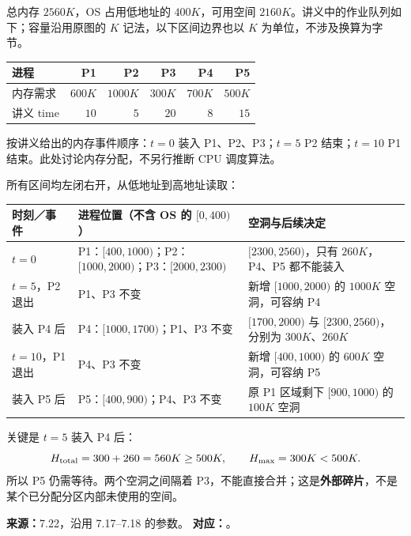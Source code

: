 总内存 $2560K$，OS 占用低地址的 $400K$，可用空间 $2160K$。讲义中的作业队列如下；容量沿用原图的 $K$ 记法，以下区间边界也以 $K$ 为单位，不涉及换算为字节。
\begin{center}
\begin{tabular}{@{}lrrrrr@{}}
\toprule
进程 & P1 & P2 & P3 & P4 & P5 \\
\midrule
内存需求 & $600K$ & $1000K$ & $300K$ & $700K$ & $500K$ \\
讲义 time & $10$ & $5$ & $20$ & $8$ & $15$ \\
\bottomrule
\end{tabular}
\end{center}
按讲义给出的内存事件顺序：$t=0$ 装入 P1、P2、P3；$t=5$ P2 结束；$t=10$ P1 结束。此处讨论内存分配，不另行推断 CPU 调度算法。

\begin{checkedsolution}
\nopagebreak[4]
所有区间均左闭右开，从低地址到高地址读取：
\begin{center}
\begin{tabularx}{\textwidth}{@{}>{\raggedright\arraybackslash}p{2.2cm}>{\raggedright\arraybackslash}X>{\raggedright\arraybackslash}X@{}}
\toprule
时刻／事件 & 进程位置（不含 OS 的 $[0,400)$） & 空洞与后续决定 \\
\midrule
$t=0$ & P1：$[400,1000)$；P2：$[1000,2000)$；P3：$[2000,2300)$ & $[2300,2560)$，只有 $260K$，P4、P5 都不能装入 \\
$t=5$，P2 退出 & P1、P3 不变 & 新增 $[1000,2000)$ 的 $1000K$ 空洞，可容纳 P4 \\
装入 P4 后 & P4：$[1000,1700)$；P1、P3 不变 & $[1700,2000)$ 与 $[2300,2560)$，分别为 $300K$、$260K$ \\
$t=10$，P1 退出 & P4、P3 不变 & 新增 $[400,1000)$ 的 $600K$ 空洞，可容纳 P5 \\
装入 P5 后 & P5：$[400,900)$；P4、P3 不变 & 原 P1 区域剩下 $[900,1000)$ 的 $100K$ 空洞 \\
\bottomrule
\end{tabularx}
\end{center}

关键是 $t=5$ 装入 P4 后：
\[
 H_{\rm total}=300+260=560K\ge500K,
 \qquad H_{\rm max}=300K<500K.
\]
所以 P5 仍需等待。两个空洞之间隔着 P3，不能直接合并；这是\textbf{外部碎片}，不是某个已分配分区内部未使用的空间。
\end{checkedsolution}


\textbf{来源：}7.22，沿用 7.17--7.18 的参数。\quad
\textbf{对应：}。

